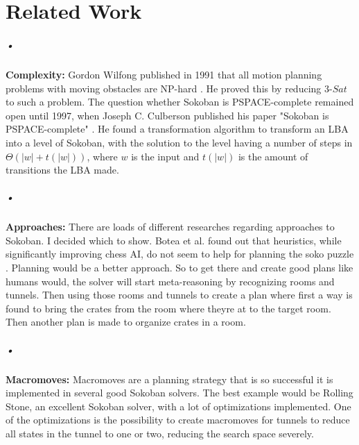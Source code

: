 \documentclass{report}
\begin{document}
\chapter{Related Work}
\paragraph*{•}
\textbf{Complexity:} Gordon Wilfong published in 1991 that all motion planning problems with moving obstacles are NP-hard \cite{WilfongNPhard}. He proved this by reducing $3$-$Sat$ to such a problem. The question whether Sokoban is PSPACE-complete remained open until 1997, when Joseph C. Culberson published his paper "Sokoban is PSPACE-complete" \cite{PSpaceComplete}. He found a transformation algorithm to transform an LBA into a level of Sokoban, with the solution to the level having a number of steps in $\Theta (|w|+t(|w|))$, where $w$ is the input and $t(|w|)$ is the amount of transitions the LBA made. %
\paragraph*{•}
\textbf{Approaches:} There are loads of different researches regarding approaches to Sokoban. I decided which to show. Botea et al. found out that heuristics, while significantly improving chess AI, do not seem to help for planning the soko puzzle \cite{BoteaHeuristicsVsPlanning}. Planning would be a better approach. So to get there and create good plans like humans would, the solver will start meta-reasoning by recognizing rooms and tunnels. Then using those rooms and tunnels to create a plan where first a way is found to bring the crates from the room where theyre at to the target room. Then another plan is made to organize crates in a room.
\paragraph*{•}
\textbf{Macromoves:} Macromoves are a planning strategy that is so successful it is implemented in several good Sokoban solvers. The best example would be Rolling Stone, an excellent Sokoban solver, with a lot of optimizations implemented. One of the optimizations is the possibility to create macromoves for tunnels to reduce all states in the tunnel to one or two, reducing the search space severely.
\end{document}
